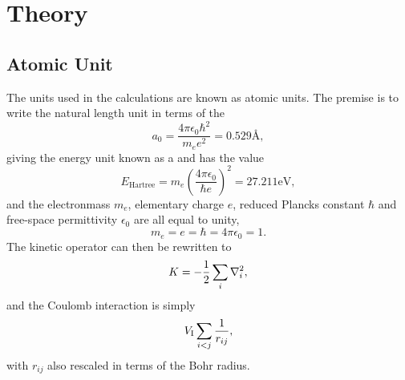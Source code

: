 
\chapter{Theory\label{appendix:A}}

\section{Atomic Unit\label{appendix:Aatomic}}
    The units used in the calculations are known as atomic units. The premise
    is to write the natural length unit in terms of the \cite{GriffQuan} 
        \begin{equation}
            a_0 = \frac{4\pi\epsilon_0\hbar^2}{m_ee^2} = 0.529\text{\AA},
        \end{equation}
    giving the energy unit known as a  and has the value
        \begin{equation}
            E_{\text{Hartree}} = m_e\left(\frac{4\pi\epsilon_0}{\hbar
            e}\right)^2 = 27.211 \text{eV},
        \end{equation}
    and the electronmass $m_e$, elementary charge $e$, reduced Plancks constant
    $\hbar$ and free-space permittivity $\epsilon_0$ are all equal to unity,
        \begin{equation}
            m_e = e = \hbar = 4\pi\epsilon_0 = 1.
        \end{equation}
    The kinetic operator can then be rewritten to
        \begin{equation}
            K = - \frac{1}{2} \sum\limits_{i} \nabla^2_i,
        \end{equation}
    and the Coulomb interaction is simply
        \begin{equation}
            V_{\text{I}} \sum\limits_{i<j} \frac{1}{r_{ij}},
        \end{equation}
    with $r_{ij}$ also rescaled in terms of the Bohr radius.

